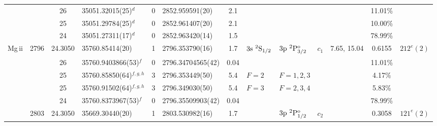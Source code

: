 \begin{table*}
\begin{center}
{\begin{tabular}{:l;l;c;l;c;l;c;l;l;c;c;c;c}
\rowstyle{\itshape}               &        & 26        & 35051.32015(25)$^{d}$            & 0 &   2852.959591(20)  &  2.1 & $                                        $ & $                                        $ & $      $ &              & 11.01\%   & $     ^{}     $\\
\rowstyle{\itshape}               &        & 25        & 35051.29784(25)$^{d}$            & 0 &   2852.961407(20)  &  2.1 & $                                        $ & $                                        $ & $      $ &              & 10.00\%   & $     ^{}     $\\
\rowstyle{\itshape}               &        & 24        & 35051.27311(17)$^{d}$            & 0 &   2852.963420(14)  &  1.5 & $                                        $ & $                                        $ & $      $ &              & 78.99\%   & $     ^{}     $\\
                    Mg{\sc \,ii}  & 2796   & 24.3050   & 35760.85414(20)$^{}$             & 1 &   2796.353790(16)  &  1.7 & $3\rm{s}~^2\rm{S}_{1/2}                  $ & $3\rm{p}~^2\rm{P}_{3/2}^{\rm o}          $ & $c_{1} $ & 7.65, 15.04  & 0.6155    & $  212^{e}(2)  $\\
\rowstyle{\itshape}               &        & 26        & 35760.9403866(53)$^{f}$          & 0 & 2796.34704565(42)  & 0.04 & $                                        $ & $                                        $ & $      $ &              & 11.01\%   & $     ^{}     $\\
\rowstyle{\itshape}               &        & 25        & 35760.85850(64)$^{f,g,h}$        & 3 &   2796.353449(50)  &  5.4 & $F=2                                     $ & $F=1,2,3                                 $ & $      $ &              & 4.17\%    & $     ^{}     $\\
\rowstyle{\itshape}               &        & 25        & 35760.91502(64)$^{f,g,h}$        & 3 &   2796.349030(50)  &  5.4 & $F=3                                     $ & $F=2,3,4                                 $ & $      $ &              & 5.83\%    & $     ^{}     $\\
\rowstyle{\itshape}               &        & 24        & 35760.8373967(53)$^{f}$          & 0 & 2796.35509903(42)  & 0.04 & $                                        $ & $                                        $ & $      $ &              & 78.99\%   & $     ^{}     $\\
                                  & 2803   & 24.3050   & 35669.30440(20)$^{}$             & 1 &   2803.530982(16)  &  1.7 & $                                        $ & $3\rm{p}~^2\rm{P}_{1/2}^{\rm o}          $ & $c_{2} $ &              & 0.3058    & $  121^{e}(2)  $\\

\end{tabular}}
\end{center}
\end{table*}
